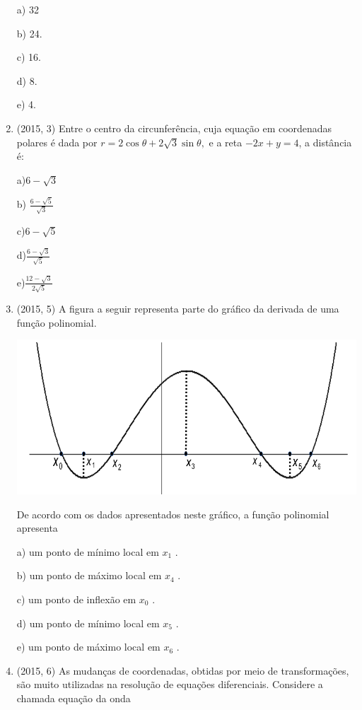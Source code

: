 \documentclass{article}
\begin{document}
\begin{enumerate}
a) 32

b) 24.

c) 16.

d) 8.

e) 4.\newline



\item (2015, 3) Entre o centro da circunferência, cuja equação em coordenadas polares é dada por $r=2 \cos\theta +2 \sqrt{3}  \sin\theta,$ e a reta $-2 x+ y=4 $, a distância é:

a)$ 6 -\sqrt{3}$

b) $\frac{6 -\sqrt{5}}{\sqrt{3}}$

c)$ 6 -\sqrt{5}$

d)$ \frac{6 -\sqrt{3}}{\sqrt{5}}$

e)$ \frac{12 -\sqrt{3}}{2\sqrt{5}}$\newline



\item (2015, 5) A figura a seguir representa parte do gráfico da derivada de uma função polinomial.


\includegraphics[width=10 cm]{05-2015.png}\newline

De acordo com os dados apresentados neste gráfico, a função polinomial apresenta\newline

a) um ponto de mínimo local em $x_1$ .

b) um ponto de máximo local em $x_4$ .

c) um ponto de inflexão em $x_0$ .

d) um ponto de mínimo local em $x_5$ .

e) um ponto de máximo local em $x_6$ .



\item (2015, 6) As mudanças de coordenadas, obtidas por meio de transformações, são muito utilizadas na resolução de equações diferenciais. Considere a chamada equação da onda\newline


\end{enumerate}
\end{document}
